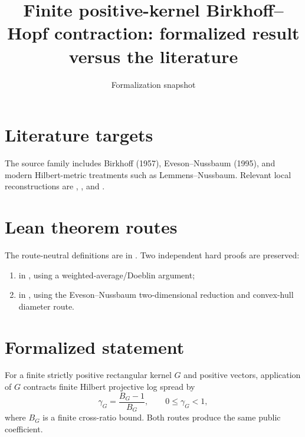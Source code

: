 \title{Finite positive-kernel Birkhoff--Hopf contraction: formalized result versus the literature}
\author{}
\date{Formalization snapshot \snapshot}

\maketitle
{}
\section{Literature targets}
The source family includes Birkhoff (1957), Eveson--Nussbaum (1995), and modern Hilbert-metric treatments such as Lemmens--Nussbaum.  Relevant local reconstructions are
,
, and
.

\section{Lean theorem routes}
The route-neutral definitions are in
.
Two independent hard proofs are preserved:
\begin{enumerate}[leftmargin=2em]
\item {} in , using a weighted-average/Doeblin argument;
\item {} in , using the Eveson--Nussbaum two-dimensional reduction and convex-hull diameter route.
\end{enumerate}

\section{Formalized statement}
For a finite strictly positive rectangular kernel $G$ and positive vectors, application of $G$ contracts finite Hilbert projective log spread by
\[
 \gamma_G=\frac{B_G-1}{B_G},\qquad 0\le\gamma_G<1,
\]
where $B_G$ is a finite cross-ratio bound.  Both routes produce the same public coefficient.

